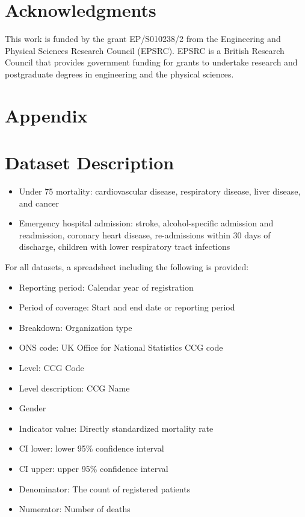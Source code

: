 \documentclass[Afour,sagev,times]{sagej}
\begin{document}
\section{Acknowledgments}
This work is funded by the grant EP/S010238/2 from the Engineering and Physical Sciences Research Council (EPSRC). EPSRC is a British Research Council that provides government funding for grants to undertake research and postgraduate degrees in engineering and the physical sciences.




\cleardoublepage

\section{Appendix}
\appendix

\section{Dataset Description}
\label{dataset}
\begin{itemize}
    \setlength\itemsep{0px}
    \item Under 75 mortality: cardiovascular disease, respiratory disease, liver disease, and cancer
    \item Emergency hospital admission: stroke, alcohol-specific admission and readmission, coronary heart disease, re-admissions within 30 days of discharge, children with lower respiratory tract infections
\end{itemize}

For all datasets, a spreadsheet including the following is provided:

\begin{itemize}
    \setlength\itemsep{0px}
    \item Reporting period: Calendar year of registration
    \item Period of coverage: Start and end date or reporting period
    \item Breakdown: Organization type
    \item ONS code: UK Office for National Statistics CCG code
    \item Level: CCG Code
    \item Level description: CCG Name
    \item Gender
    \item Indicator value: Directly standardized mortality rate
    \item CI lower: lower 95\% confidence interval
    \item CI upper: upper 95\% confidence interval
    \item Denominator: The count of registered patients
    \item Numerator: Number of deaths
\end{itemize}
\end{document}
